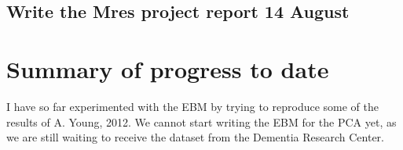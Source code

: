 \documentclass[12pt,a4paper,oneside]{report}
\begin{document}
\subsection*{\noindent Write the Mres project report  \hfill  14 August}



\section*{Summary of progress to date}

I have so far experimented with the EBM by trying to reproduce some of the results of A. Young, 2012. We cannot start writing the EBM for the PCA yet, as we are still waiting to receive the dataset from the Dementia Research Center.
\end{document}
